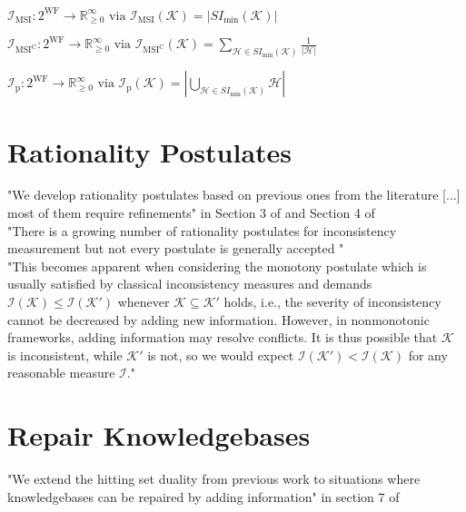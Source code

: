 \(\mathcal{I}_{\text{MSI}}: 2^{\text{WF}} \rightarrow \mathbb{R}_{\geq 0}^{\infty} \text{ via } \mathcal{I}_{\text{MSI}}(\mathcal{K}) = \left| SI_{\min}(\mathcal{K}) \right|\)

\(\mathcal{I}_{\text{MSI}^\text{C}}: 2^{\text{WF}} \rightarrow \mathbb{R}_{\geq 0}^{\infty} \text{ via } \mathcal{I}_{\text{MSI}^\text{C}}(\mathcal{K}) = \sum_{\mathcal{H} \in SI_{\min}(\mathcal{K})} \frac{1}{|\mathcal{H}|}\)
\cite{hunter_measuring_2008}

\(\mathcal{I}_{\text{p}}: 2^{\text{WF}} \rightarrow \mathbb{R}_{\geq 0}^{\infty} \text{ via } \mathcal{I}_{\text{p}}(\mathcal{K}) = \left| \bigcup_{\mathcal{H} \in SI_{\min}(\mathcal{K})} \mathcal{H} \right|\)
\cite{liu_measuring_2011}

\section{Rationality Postulates}
"We develop rationality postulates based on previous ones from the literature [...] most of them require refinements" in Section 3 of \cite{ulbricht_measuring_2018} and Section 4 of \cite{ulbricht_handling_2020}
\\
"There is a growing number of rationality postulates for inconsistency measurement but not every postulate is generally accepted \cite{hameurlain_basic_2017} \cite{ferme_revisiting_2014}"
\\
"This becomes apparent when considering the monotony postulate which is usually satisfied by classical inconsistency measures and demands \(\mathcal{I}(\mathcal{K}) \leq \mathcal{I}(\mathcal{K}')\) whenever \(\mathcal{K} \subseteq \mathcal{K}'\) holds, i.e., the severity of inconsistency cannot be decreased by adding new information. However, in nonmonotonic frameworks, adding information may resolve conflicts. It is thus possible that \(\mathcal{K}\) is inconsistent, while \(\mathcal{K}'\) is not, so we would expect \(\mathcal{I}(\mathcal{K}') < \mathcal{I}(\mathcal{K})\) for any reasonable measure \(\mathcal{I}\)."

\section{Repair Knowledgebases}
"We extend the hitting set duality from previous work \cite{brewka_strong_2019} to situations where knowledgebases can be repaired by adding information" in section 7 of \cite{ulbricht_handling_2020}
